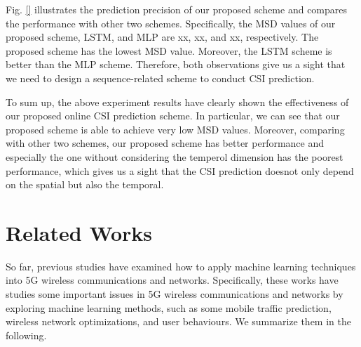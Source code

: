 \documentclass[10pt,journal,cspaper,compsoc]{IEEEtran}
\begin{document}


Fig. \ref{} illustrates the prediction precision of our proposed scheme and compares the performance with other two schemes. Specifically, the MSD values of our proposed scheme, LSTM, and MLP are xx, xx, and xx, respectively. The proposed scheme has the lowest MSD value. Moreover, the LSTM scheme is better than the MLP scheme. Therefore, both observations give us a sight that we need to design a sequence-related scheme to conduct CSI prediction.


To sum up, the above experiment results have clearly shown the effectiveness of our proposed online CSI prediction scheme. In particular, we can see that our proposed scheme is able to achieve very low MSD values. Moreover, comparing with other two schemes, our proposed scheme has better performance and especially the one without considering the temperol dimension has the poorest performance, which gives us a sight that the CSI prediction doesnot only depend on the spatial but also the temporal.


\section{Related Works}
\label{sec:related-work}

So far, previous studies have examined how to apply machine learning techniques into 5G wireless communications and networks. Specifically, these works have studies some important issues in 5G wireless communications and networks by exploring machine learning methods, such as some mobile traffic prediction, wireless network optimizations, and user behaviours. We summarize them in the following.
\end{document}
